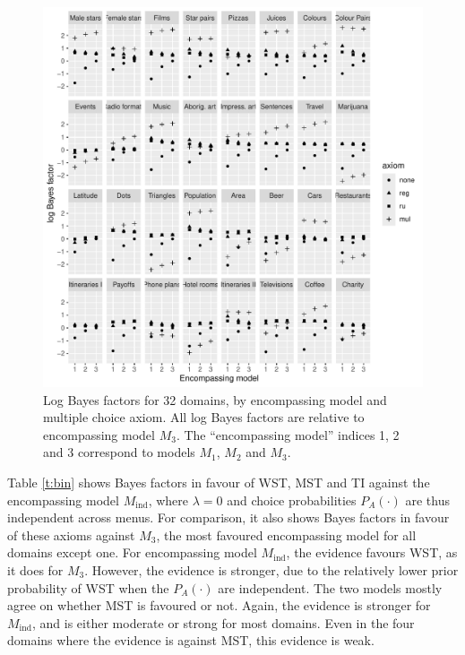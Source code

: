 \documentclass[11pt,letter]{article}
\newcommand{\menus}{menus}
\begin{document}
\begin{figure}
	\begin{center}
	\includegraphics[width=16cm]{Figures/multiple_BF}
	\caption{Log Bayes factors for 32 domains, by encompassing model and multiple choice axiom. All log Bayes factors are relative to encompassing model $M_3$. The ``encompassing model'' indices 1, 2 and 3 correspond to models $M_1$, $M_2$ and $M_3$.}\label{f:multiple_BF}
	\end{center}
\end{figure}

Table \ref{t:bin} shows Bayes factors in favour of WST, MST and TI against the encompassing model $M_{\mathrm{ind}}$, where $\lambda = 0$ and choice probabilities $P_A(\cdot)$ are thus independent across \menus{}.
For comparison, it also shows Bayes factors in favour of these axioms against $M_3$, the most favoured encompassing model for all domains except one.
For encompassing model $M_{\mathrm{ind}}$, the evidence favours WST, as it does for $M_3$.
However, the evidence is stronger, due to the relatively lower prior probability of WST when the $P_A(\cdot)$ are independent.
The two models mostly agree on whether MST is favoured or not.
Again, the evidence is stronger for $M_{\mathrm{ind}}$, and is either moderate or strong for most domains.
Even in the four domains where the evidence is against MST, this evidence is weak.
\end{document}
